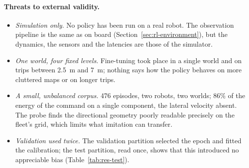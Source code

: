 \paragraph{Threats to external validity.}
\begin{itemize}
  \item \emph{Simulation only.} No policy has been run on a real robot. The
        observation pipeline is the same as on board
        (Section~\ref{sec:rl-environment}), but the dynamics, the sensors and
        the latencies are those of the simulator.
  \item \emph{One world, four fixed levels.} Fine-tuning took place in a single
        world and on trips between \SI{2.5}{\metre} and \SI{7}{\metre}; nothing
        says how the policy behaves on more cluttered maps or on longer trips.
  \item \emph{A small, unbalanced corpus.} \num{476} episodes, two robots, two
        worlds; 86\% of the energy of the command on a single component, the
        lateral velocity absent. The probe finds the directional geometry poorly
        readable precisely on the fleet's grid, which limits what imitation can
        transfer.
  \item \emph{Validation used twice.} The validation partition selected the
        epoch and fitted the calibration; the test partition, read once, shows
        that this introduced no appreciable bias (Table~\ref{tab:res-test}).
\end{itemize}

